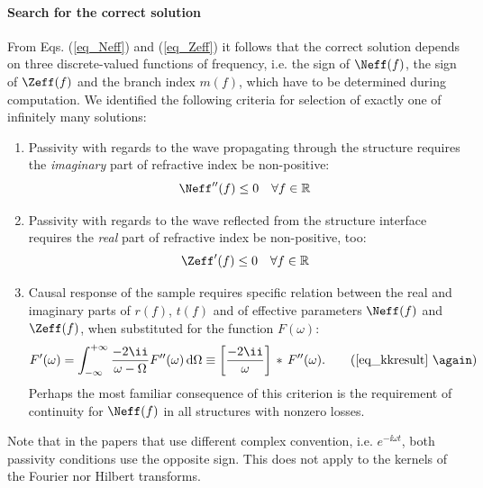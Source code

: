 \paragraph{Search for the correct solution} %
From Eqs. (\ref{eq_Neff}) and (\ref{eq_Zeff}) it follows that the correct solution depends on three discrete-valued functions of frequency, i.e. the sign of $\Neff(f)$, the sign of $\Zeff(f)$ and the branch index $m(f)$, which have to be determined during computation.  We identified the following criteria for selection of exactly one of infinitely many solutions:
\begin{enumerate}
	\item{Passivity with regards to the wave propagating through the structure requires the \textit{imaginary} part of refractive index be non-positive: 
		 \begin{equation} \Neff''(f) \leq 0 \quad \forall f\in \mathbb{R} \label{eq_Neff_pass}\end{equation}
		 } 
	 \item{Passivity with regards to the wave reflected from the structure interface requires the \textit{real} part of refractive index be non-positive, too: 
		 \begin{equation} \Zeff'(f) \leq 0 \quad \forall f\in \mathbb{R} \label{eq_Zeff_pass}\end{equation}
		 } 
	 \item{Causal response of the sample requires specific relation between the real and imaginary parts of $r(f)$, $t(f)$ and of effective parameters $\Neff(f)$ and $\Zeff(f)$, when substituted for the function $F(\omega)$:
		 \begin{equation} 
F'(\omega) = \int_{-\infty}^{+\infty}  \frac{-2\ii}{\omega - \Omega} F''(\omega) \,\mbox{d}\Omega  \equiv  \left[\frac{-2\ii}{\omega}\right]\,\ast\,F''(\omega). \tag{\ref{eq_kkresult} \again}\end{equation} 
Perhaps the most familiar consequence of this criterion is the requirement of continuity for $\Neff(f)$ in all structures with nonzero losses.
		 } 
\end{enumerate}
Note that in the papers that use different complex convention, i.e. $e^{-\ii\omega t}$, both passivity conditions use the opposite sign. This does not apply to the kernels of the Fourier nor Hilbert transforms.

